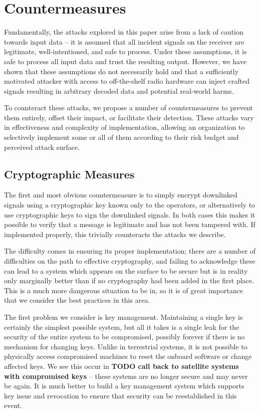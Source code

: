 \section{Countermeasures}\label{sec:countermeasures}

Fundamentally, the attacks explored in this paper arise from a lack of caution towards input data -- it is assumed that all incident signals on the receiver are legitimate, well-intentioned, and safe to process.
Under these assumptions, it is safe to process all input data and trust the resulting output.
However, we have shown that these assumptions do not necessarily hold and that a sufficiently motivated attacker with access to off-the-shelf radio hardware can inject crafted signals resulting in arbitrary decoded data and potential real-world harms.

To counteract these attacks, we propose a number of countermeasures to prevent them entirely, offset their impact, or facilitate their detection.
These attacks vary in effectiveness and complexity of implementation, allowing an organization to selectively implement some or all of them according to their risk budget and perceived attack surface.


\subsection{Cryptographic Measures}

The first and most obvious countermeasure is to simply encrypt downlinked signals using a cryptographic key known only to the operators, or alternatively to use cryptographic keys to sign the downlinked signals.
In both cases this makes it possible to verify that a message is legitimate and has not been tampered with.
If implemented properly, this trivially counteracts the attacks we describe.

The difficulty comes in ensuring its proper implementation; there are a number of difficulties on the path to effective cryptography, and failing to acknowledge these can lead to a system which appears on the surface to be secure but is in reality only marginally better than if no cryptography had been added in the first place.
This is a much more dangerous situation to be in, so it is of great importance that we consider the best practices in this area.

The first problem we consider is key management.
Maintaining a single key is certainly the simplest possible system, but all it takes is a single leak for the security of the entire system to be compromised, possibly forever if there is no mechanism for changing keys.
Unlike in terrestrial systems, it is not possible to physically access compromised machines to reset the onboard software or change affected keys.
We see this occur in \textbf{TODO call back to satellite systems with compromised keys} -- these systems are no longer secure and may never be again.
It is much better to build a key management system which supports key issue and revocation to ensure that security can be reestablished in this event.

